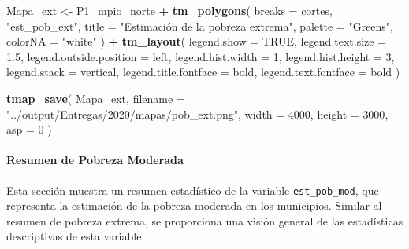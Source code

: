 \documentclass[
  12pt,
]{book}
\newenvironment{Shaded}{\begin{snugshade}}{\end{snugshade}}
\newcommand{\AttributeTok}[1]{\textcolor[rgb]{0.13,0.29,0.53}{#1}}
\newcommand{\ConstantTok}[1]{\textcolor[rgb]{0.56,0.35,0.01}{#1}}
\newcommand{\DecValTok}[1]{\textcolor[rgb]{0.00,0.00,0.81}{#1}}
\newcommand{\FloatTok}[1]{\textcolor[rgb]{0.00,0.00,0.81}{#1}}
\newcommand{\FunctionTok}[1]{\textcolor[rgb]{0.13,0.29,0.53}{\textbf{#1}}}
\newcommand{\NormalTok}[1]{#1}
\newcommand{\OtherTok}[1]{\textcolor[rgb]{0.56,0.35,0.01}{#1}}
\newcommand{\SpecialCharTok}[1]{\textcolor[rgb]{0.81,0.36,0.00}{\textbf{#1}}}
\newcommand{\StringTok}[1]{\textcolor[rgb]{0.31,0.60,0.02}{#1}}
\begin{document}
\begin{Shaded}
\begin{Highlighting}[]
\NormalTok{Mapa\_ext }\OtherTok{\textless{}{-}}
\NormalTok{  P1\_mpio\_norte }\SpecialCharTok{+} \FunctionTok{tm\_polygons}\NormalTok{(}
    \AttributeTok{breaks =}\NormalTok{ cortes,}
    \StringTok{"est\_pob\_ext"}\NormalTok{,}
    \AttributeTok{title =} \StringTok{"Estimación de la pobreza extrema"}\NormalTok{,}
    \AttributeTok{palette =} \StringTok{"Greens"}\NormalTok{,}
    \AttributeTok{colorNA =} \StringTok{"white"}
\NormalTok{  ) }\SpecialCharTok{+} \FunctionTok{tm\_layout}\NormalTok{(}
    \AttributeTok{legend.show =} \ConstantTok{TRUE}\NormalTok{,}
    \AttributeTok{legend.text.size =} \FloatTok{1.5}\NormalTok{,}
    \AttributeTok{legend.outside.position =} \StringTok{\textquotesingle{}left\textquotesingle{}}\NormalTok{,}
    \AttributeTok{legend.hist.width =} \DecValTok{1}\NormalTok{,}
    \AttributeTok{legend.hist.height =} \DecValTok{3}\NormalTok{,}
    \AttributeTok{legend.stack =} \StringTok{\textquotesingle{}vertical\textquotesingle{}}\NormalTok{,}
    \AttributeTok{legend.title.fontface =} \StringTok{\textquotesingle{}bold\textquotesingle{}}\NormalTok{,}
    \AttributeTok{legend.text.fontface =} \StringTok{\textquotesingle{}bold\textquotesingle{}}
\NormalTok{  )}

\FunctionTok{tmap\_save}\NormalTok{(}
\NormalTok{  Mapa\_ext,}
  \AttributeTok{filename =} \StringTok{"../output/Entregas/2020/mapas/pob\_ext.png"}\NormalTok{,}
  \AttributeTok{width =} \DecValTok{4000}\NormalTok{,}
  \AttributeTok{height =} \DecValTok{3000}\NormalTok{,}
  \AttributeTok{asp =} \DecValTok{0}
\NormalTok{)}
\end{Highlighting}
\end{Shaded}

\hypertarget{resumen-de-pobreza-moderada}{%
\paragraph*{Resumen de Pobreza Moderada}\label{resumen-de-pobreza-moderada}}

Esta sección muestra un resumen estadístico de la variable \texttt{est\_pob\_mod}, que representa la estimación de la pobreza moderada en los municipios. Similar al resumen de pobreza extrema, se proporciona una visión general de las estadísticas descriptivas de esta variable.

\begin{Shaded}
\end{Shaded}
\end{document}
